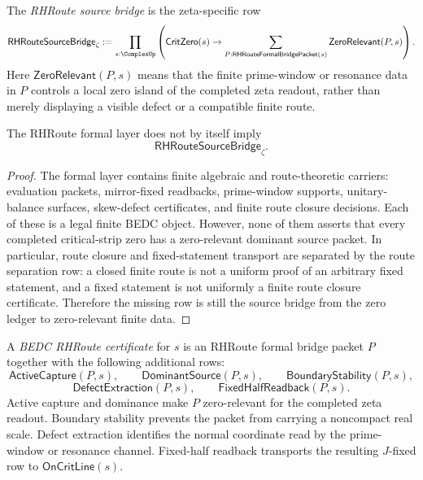 \begin{definition}
\label{def:unified-reality-rhroute-source-bridge}
The \emph{RHRoute source bridge} is the zeta-specific row
$$
\mathsf{RHRouteSourceBridge}_{\zeta}
:=
\prod_{s:\ComplexUp}
\left(
\mathsf{CritZero}(s)
\to
\sum_{P:\mathsf{RHRouteFormalBridgePacket}(s)}
\mathsf{ZeroRelevant}(P,s)
\right).
$$
Here $\mathsf{ZeroRelevant}(P,s)$ means that the finite prime-window or
resonance data in $P$ controls a local zero island of the completed
zeta readout, rather than merely displaying a visible defect or a
compatible finite route.
\end{definition}

\begin{theorem}
\label{thm:unified-reality-formal-layer-not-source-bridge}
The RHRoute formal layer does not by itself imply
$$
\mathsf{RHRouteSourceBridge}_{\zeta}.
$$
\end{theorem}

\begin{proof}
The formal layer contains finite algebraic and route-theoretic carriers:
evaluation packets, mirror-fixed readbacks, prime-window supports,
unitary-balance surfaces, skew-defect certificates, and finite route
closure decisions.  Each of these is a legal finite BEDC object.
However, none of them asserts that every completed critical-strip zero
has a zero-relevant dominant source packet.  In particular, route
closure and fixed-statement transport are separated by the route
separation row: a closed finite route is not a uniform proof of an
arbitrary fixed statement, and a fixed statement is not uniformly a
finite route closure certificate.  Therefore the missing row is still
the source bridge from the zero ledger to zero-relevant finite data.
\end{proof}

\begin{definition}
\label{def:unified-reality-bedc-rhroute-certificate}
A \emph{BEDC RHRoute certificate} for $s$ is an RHRoute formal bridge
packet $P$ together with the following additional rows:
$$
\mathsf{ActiveCapture}(P,s),
\qquad
\mathsf{DominantSource}(P,s),
\qquad
\mathsf{BoundaryStability}(P,s),
$$
$$
\mathsf{DefectExtraction}(P,s),
\qquad
\mathsf{FixedHalfReadback}(P,s).
$$
Active capture and dominance make $P$ zero-relevant for the completed
zeta readout.  Boundary stability prevents the packet from carrying a
noncompact real scale.  Defect extraction identifies the normal
coordinate read by the prime-window or resonance channel.  Fixed-half
readback transports the resulting $J$-fixed row to
$\mathsf{OnCritLine}(s)$.
\end{definition}

